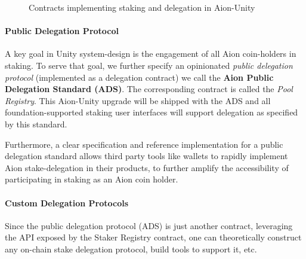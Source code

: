 \begin{figure}[ht]
\centering
{}
\caption{Contracts implementing staking and delegation in Aion-Unity}
\label{fig:delegation_scheme}
\end{figure}

\paragraph{Public Delegation Protocol}
A key goal in Unity system-design is the engagement of all Aion coin-holders in staking. To serve that goal, we further specify an opinionated \textit{public delegation protocol} (implemented as a delegation contract) we call the \textbf{Aion Public Delegation Standard (ADS)}. The corresponding contract is called the \textit{Pool Registry}. This Aion-Unity upgrade will be shipped with the ADS and all foundation-supported staking user interfaces will support delegation as specified by this standard. 

Furthermore, a clear specification and reference implementation for a public delegation standard allows third party tools like wallets to rapidly implement Aion stake-delegation in their products, to further amplify the accessibility of participating in staking as an Aion coin holder. 
    
\paragraph{Custom Delegation Protocols}
Since the public delegation protocol (ADS) is just another contract, leveraging the API exposed by the Staker Registry contract, one can theoretically construct any on-chain stake delegation protocol, build tools to support it, etc. 

